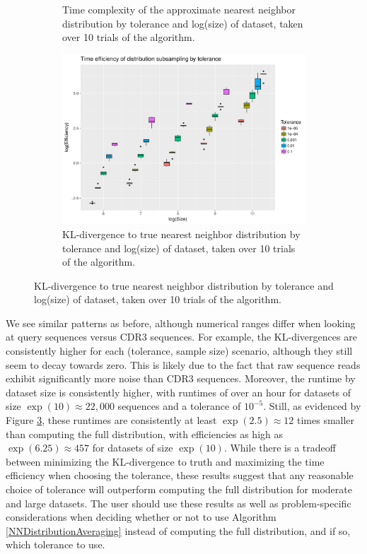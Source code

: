\documentclass{article}
\begin{document}
\begin{figure}
\begin{subfigure}{0.5\textwidth}
    	\caption{Time complexity of the approximate nearest neighbor distribution by tolerance and log(size) of dataset, taken over 10 trials of the algorithm.}
    	\label{fig:TimeBySizeFull}
    \end{subfigure}
    \begin{subfigure}{0.5\textwidth}
        \includegraphics[width=\linewidth]{Figures/NearestNeighbor/efficiency_by_size_and_tol.pdf}
    	\caption{KL-divergence to true nearest neighbor distribution by tolerance and log(size) of dataset, taken over 10 trials of the algorithm.}
    	\label{fig:EfficiencyBySizeFull}
    \end{subfigure}
\end{figure}

We see similar patterns as before, although numerical ranges differ when looking at query sequences versus CDR3 sequences.
For example, the KL-divergences are consistently higher for each (tolerance, sample size) scenario, although they still seem to decay towards zero.
This is likely due to the fact that raw sequence reads exhibit significantly more noise than CDR3 sequences.
Moreover, the runtime by dataset size is consistently higher, with runtimes of over an hour for datasets of size $\exp(10) \approx 22,000$ sequences and a tolerance of $10^{-5}$. 
Still, as evidenced by Figure \ref{fig:EfficiencyBySizeFull}, these runtimes are consistently at least $\exp(2.5) \approx 12$ times smaller than computing the full distribution, with efficiencies as high as $\exp(6.25) \approx 457$ for datasets of size $\exp(10)$.
While there is a tradeoff between minimizing the KL-divergence to truth and maximizing the time efficiency when choosing the tolerance, these results suggest that any reasonable choice of tolerance will outperform computing the full distribution for moderate and large datasets.
The user should use these results as well as problem-specific considerations when deciding whether or not to use Algorithm \ref{NNDistributionAveraging} instead of computing the full distribution, and if so, which tolerance to use.
\end{document}
